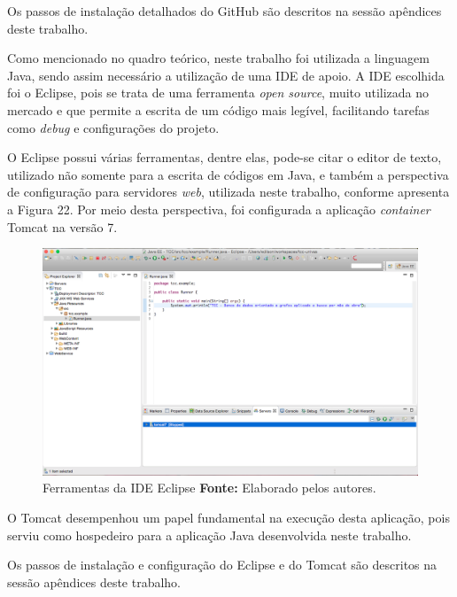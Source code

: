 \par Os passos de instalação detalhados do GitHub são descritos na sessão apêndices deste trabalho.

\par Como mencionado no quadro teórico, neste trabalho foi utilizada a linguagem Java, sendo assim necessário a utilização de uma IDE de apoio. A IDE escolhida foi o Eclipse, pois se trata de uma ferramenta \textit{open source}, muito utilizada no mercado e que permite a escrita de um código mais legível, facilitando tarefas como \textit{debug} e configurações do projeto.

\par O Eclipse possui várias ferramentas, dentre elas, pode-se citar o editor de texto, utilizado não somente para a escrita de códigos em Java, e também a perspectiva de configuração para servidores \textit{web}, utilizada neste trabalho, conforme apresenta a Figura 22. Por meio desta perspectiva, foi configurada a aplicação \textit{container} Tomcat na versão 7.

\newpage
\begin{figure}[h!]
	\centerline{\includegraphics[scale=0.35]{./imagens/eclipse-editor-texto.png}}
	\caption[Ferramentas da IDE Eclipse]
	{Ferramentas da IDE Eclipse \textbf{Fonte:} Elaborado pelos autores.}
	\label{fig:exemplo1}
\end{figure}

\par O Tomcat desempenhou um papel fundamental na execução desta aplicação, pois serviu como hospedeiro para a aplicação Java desenvolvida neste trabalho. 

\par Os passos de instalação e configuração do Eclipse e do Tomcat são descritos na sessão apêndices deste trabalho.

